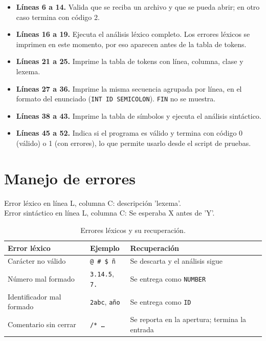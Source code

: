 \documentclass[12pt]{article}
\newcommand{\cmd}[1]{\texttt{\small #1}}
\begin{document}
\begin{itemize}[leftmargin=1.1cm,itemsep=0.25em]
\item \textbf{Líneas 6 a 14.} Valida que se reciba un archivo y que se pueda abrir; en otro caso
termina con código 2.
\item \textbf{Líneas 16 a 19.} Ejecuta el análisis léxico completo. Los errores léxicos se
imprimen en este momento, por eso aparecen antes de la tabla de tokens.
\item \textbf{Líneas 21 a 25.} Imprime la tabla de tokens con línea, columna, clase y lexema.
\item \textbf{Líneas 27 a 36.} Imprime la misma secuencia agrupada por línea, en el formato del
enunciado (\cmd{INT ID SEMICOLON}). \cmd{FIN} no se muestra.
\item \textbf{Líneas 38 a 43.} Imprime la tabla de símbolos y ejecuta el análisis sintáctico.
\item \textbf{Líneas 45 a 52.} Indica si el programa es válido y termina con código 0 (válido) o
1 (con errores), lo que permite usarlo desde el script de pruebas.
\end{itemize}

\section{Manejo de errores}
\label{sec:errores}

\begin{respuesta}
\small\ttfamily
Error léxico en línea L, columna C: descripción 'lexema'.\\
Error sintáctico en línea L, columna C: Se esperaba X antes de 'Y'.
\end{respuesta}

\begin{table}[!htbp]
\centering\small
\begin{tabularx}{\textwidth}{@{}>{\raggedright\arraybackslash}p{4.2cm} l X@{}}
\toprule
\textbf{Error léxico} & \textbf{Ejemplo} & \textbf{Recuperación} \\
\midrule
Carácter no válido & \cmd{@ \# \$ ñ} & Se descarta y el análisis sigue \\
Número mal formado & \cmd{3.14.5}, \cmd{7.} & Se entrega como \cmd{NUMBER} \\
Identificador mal formado & \cmd{2abc}, \cmd{año} & Se entrega como \cmd{ID} \\
Comentario sin cerrar & \cmd{/* \dots} & Se reporta en la apertura; termina la entrada \\
\bottomrule
\end{tabularx}
\caption{Errores léxicos y su recuperación.}
\end{table}
\end{document}
